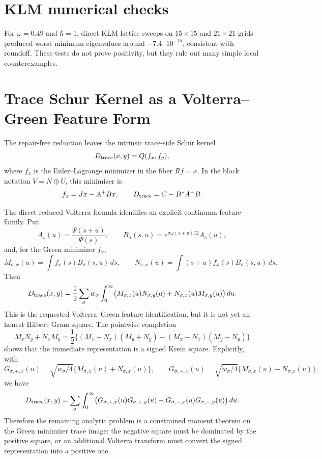 \documentclass[11pt]{article}
\begin{document}
\section{KLM numerical checks}

For $\omega=0.49$ and $\hbar=1$, direct KLM lattice sweeps on $15\times 15$
and $21\times 21$ grids produced worst minimum eigenvalues around
$-7.4\cdot 10^{-15}$, consistent with roundoff.  These tests do not prove
positivity, but they rule out many simple local counterexamples.

\section{Trace Schur Kernel as a Volterra--Green Feature Form}

The repair-free reduction leaves the intrinsic trace-side Schur kernel
\[
  D_{\rm trace}(x,y)=Q(f_x,f_y),
\]
where \(f_x\) is the Euler--Lagrange minimizer in the fiber \(Rf=x\).  In the
block notation \(V=N\oplus U\), this minimizer is
\[
  f_x=Jx-A^+Bx,
  \qquad
  D_{\rm trace}=C-B^*A^+B .
\]

The direct reduced Volterra formula identifies an explicit continuum feature
family.  Put
\[
  A_s(u)=\frac{\Psi(s+u)}{\Psi(s)},\qquad
  B_\sigma(s,u)=e^{\sigma\omega(s+u)/2}A_s(u),
\]
and, for the Green minimizer \(f_x\),
\[
  M_{\sigma,x}(u)=\int f_x(s)B_\sigma(s,u)\,ds,\qquad
  N_{\sigma,x}(u)=\int (s+u)f_x(s)B_\sigma(s,u)\,ds .
\]
Then
\[
  D_{\rm trace}(x,y)
  =
  \frac12\sum_{\sigma}w_\sigma
  \int_0^\infty
  \bigl(
    M_{\sigma,x}(u)N_{\sigma,y}(u)
    +N_{\sigma,x}(u)M_{\sigma,y}(u)
  \bigr)\,du .
\]
This is the requested Volterra--Green feature identification, but it is not
yet an honest Hilbert Gram square.  The pointwise completion
\[
  M_xN_y+N_xM_y
  =
  \frac12\{(M_x+N_x)(M_y+N_y)-(M_x-N_x)(M_y-N_y)\}
\]
shows that the immediate representation is a signed Krein square.  Explicitly,
with
\[
  G_{\sigma,+,x}(u)=\sqrt{w_\sigma/4}\{M_{\sigma,x}(u)+N_{\sigma,x}(u)\},
  \qquad
  G_{\sigma,-,x}(u)=\sqrt{w_\sigma/4}\{M_{\sigma,x}(u)-N_{\sigma,x}(u)\},
\]
we have
\[
  D_{\rm trace}(x,y)
  =
  \sum_\sigma\int_0^\infty
  \bigl(
    G_{\sigma,+,x}(u)G_{\sigma,+,y}(u)
    -
    G_{\sigma,-,x}(u)G_{\sigma,-,y}(u)
  \bigr)\,du .
\]
Therefore the remaining analytic problem is a constrained moment theorem on
the Green minimizer trace image: the negative square must be dominated by the
positive square, or an additional Volterra transform must convert the signed
representation into a positive one.
\end{document}
